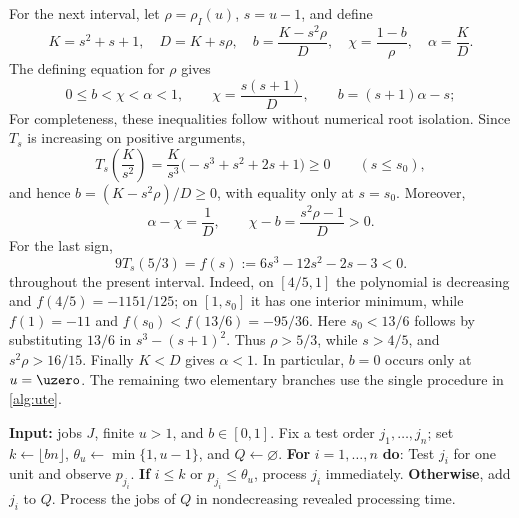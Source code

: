 For the next interval, let $\rho=\rho_I(u)$, $s=u-1$, and define
\begin{equation}
 K=s^2+s+1,
 \quad D=K+s\rho,
 \quad b=\frac{K-s^2\rho}{D},
 \quad \chi=\frac{1-b}{\rho},
 \quad \alpha=\frac KD.
 \label{eq:opt:ute-parameters}
\end{equation}
The defining equation for $\rho$ gives
\begin{equation}
 0\le b<\chi<\alpha<1,
 \qquad
 \chi=\frac{s(s+1)}D,
 \qquad
 b=(s+1)\alpha-s;
 \label{eq:opt:ute-order}
\end{equation}
For completeness, these inequalities follow without numerical root
isolation.  Since $T_s$ is increasing on positive arguments,
\begin{equation}
 T_s\!\left(\frac K{s^2}\right)
 =\frac K{s^3}\bigl(-s^3+s^2+2s+1\bigr)\ge0
 \qquad(s\le s_0),
\end{equation}
and hence $b=(K-s^2\rho)/D\ge0$, with equality only at $s=s_0$.  Moreover,
\begin{equation}
 \alpha-\chi=\frac1D,
 \qquad
 \chi-b=\frac{s^2\rho-1}{D}>0.
\end{equation}
For the last sign,
\begin{equation}
 9T_s(5/3)=f(s):=6s^3-12s^2-2s-3<0.
 \label{eq:opt:T-five-thirds}
\end{equation}
throughout the present interval.  Indeed, on $[4/5,1]$ the polynomial is
decreasing and $f(4/5)=-1151/125$; on $[1,s_0]$ it has one interior minimum,
while $f(1)=-11$ and $f(s_0)<f(13/6)=-95/36$.  Here
$s_0<13/6$ follows by substituting $13/6$ in
$s^3-(s+1)^2$.  Thus $\rho>5/3$, while $s>4/5$, and
$s^2\rho>16/15$.  Finally $K<D$ gives $\alpha<1$.  In particular, $b=0$
occurs only at $u=\uzero$.
The remaining two elementary branches use the single procedure in
\cref{alg:ute}.

\begin{algorithm}[H]
\caption{\textsc{ForcedPrefixUTE}$(J,u,b)$}
\label{alg:ute}
\begin{algorithmic}
\Statex \textbf{Input:} jobs $J$, finite $u>1$, and $b\in[0,1]$.
\State Fix a test order $j_1,\ldots,j_n$; set
       $k\gets\lfloor bn\rfloor$, $\theta_u\gets\min\{1,u-1\}$,
       and $Q\gets\varnothing$.
\State \textbf{For} $i=1,\ldots,n$ \textbf{do}:
\State \quad Test $j_i$ for one unit and observe $p_{j_i}$.
\State \quad \textbf{If} $i\le k$ or $p_{j_i}\le\theta_u$, process $j_i$
       immediately.
\State \quad \textbf{Otherwise}, add $j_i$ to $Q$.
\State Process the jobs of $Q$ in nondecreasing revealed processing time.
\end{algorithmic}
\end{algorithm}

